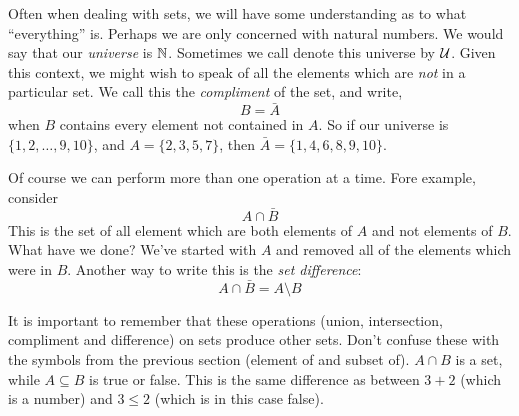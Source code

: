 \documentclass[12pt]{article}
\begin{document}
Often when dealing with sets, we will have some understanding as to what ``everything'' is.  Perhaps we are only concerned with natural numbers.  We would say that our \emph{universe} is $\mathbb N$.  Sometimes we call denote this universe by $\mathcal U$.  Given this context, we might wish to speak of all the elements which are \emph{not} in a particular set.  We call this the \emph{compliment} of the set, and write,
\[ B = \bar A\]
when $B$ contains every element not contained in $A$.  So if our universe is $\{1, 2,\ldots, 9, 10\}$, and $A = \{2, 3, 5, 7\}$, then $\bar A = \{1, 4, 6, 8, 9,10\}$.

Of course we can perform more than one operation at a time.  Fore example, consider
\[A \cap \bar B\]
This is the set of all element which are both elements of $A$ and not elements of $B$.  What have we done?  We've started with $A$ and removed all of the elements which were in $B$.  Another way to write this is the \emph{set difference}:
\[A \cap \bar B = A \setminus B\]

It is important to remember that these operations (union, intersection, compliment and difference) on sets produce other sets.  Don't confuse these with the symbols from the previous section (element of and subset of).  $A \cap B$ is a set, while $A \subseteq B$ is true or false.  This is the same difference as between $3 + 2$ (which is a number) and $3 \le 2$ (which is in this case false).
\end{document}
